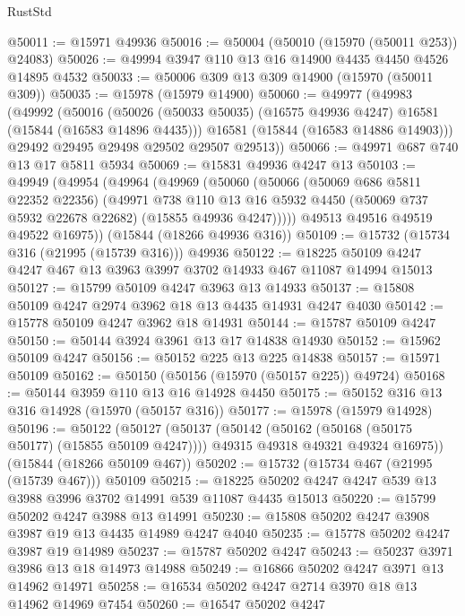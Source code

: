 \begin{lexlean}{RustStd}
\begin{coremodule}
@50011 := @15971 @49936
@50016 := @50004 (@50010 (@15970 (@50011 @253)) @24083)
@50026 := @49994 @3947 @110 @13 @16 @14900 @4435 @4450 @4526 @14895 @4532
@50033 := @50006 @309 @13 @309 @14900 (@15970 (@50011 @309))
@50035 := @15978 (@15979 @14900)
@50060 := @49977
    (@49983
      (@49992
        (@50016
          (@50026 (@50033 @50035) (@16575 @49936 @4247) @16581 (@15844 (@16583 @14896 @4435)))
          @16581
          (@15844 (@16583 @14886 @14903)))
        @29492
        @29495
        @29498
        @29502
        @29507
        @29513))
@50066 := @49971 @687 @740 @13 @17 @5811 @5934
@50069 := @15831 @49936 @4247 @13
@50103 := @49949
    (@49954
      (@49964
        (@49969
          (@50060
            (@50066
              (@50069 @686 @5811 @22352 @22356)
              (@49971
                @738
                @110
                @13
                @16
                @5932
                @4450
                (@50069 @737 @5932 @22678 @22682)
                (@15855 @49936 @4247)))))
        @49513
        @49516
        @49519
        @49522
        @16975))
    (@15844 (@18266 @49936 @316))
@50109 := @15732 (@15734 @316 (@21995 (@15739 @316))) @49936
@50122 := @18225 @50109 @4247 @4247 @467 @13 @3963 @3997 @3702 @14933 @467 @11087 @14994 @15013
@50127 := @15799 @50109 @4247 @3963 @13 @14933
@50137 := @15808 @50109 @4247 @2974 @3962 @18 @13 @4435 @14931 @4247 @4030
@50142 := @15778 @50109 @4247 @3962 @18 @14931
@50144 := @15787 @50109 @4247
@50150 := @50144 @3924 @3961 @13 @17 @14838 @14930
@50152 := @15962 @50109 @4247
@50156 := @50152 @225 @13 @225 @14838
@50157 := @15971 @50109
@50162 := @50150 (@50156 (@15970 (@50157 @225)) @49724)
@50168 := @50144 @3959 @110 @13 @16 @14928 @4450
@50175 := @50152 @316 @13 @316 @14928 (@15970 (@50157 @316))
@50177 := @15978 (@15979 @14928)
@50196 := @50122
    (@50127
      (@50137
        (@50142 (@50162 (@50168 (@50175 @50177) (@15855 @50109 @4247))))
        @49315
        @49318
        @49321
        @49324
        @16975))
    (@15844 (@18266 @50109 @467))
@50202 := @15732 (@15734 @467 (@21995 (@15739 @467))) @50109
@50215 := @18225 @50202 @4247 @4247 @539 @13 @3988 @3996 @3702 @14991 @539 @11087 @4435 @15013
@50220 := @15799 @50202 @4247 @3988 @13 @14991
@50230 := @15808 @50202 @4247 @3908 @3987 @19 @13 @4435 @14989 @4247 @4040
@50235 := @15778 @50202 @4247 @3987 @19 @14989
@50237 := @15787 @50202 @4247
@50243 := @50237 @3971 @3986 @13 @18 @14973 @14988
@50249 := @16866 @50202 @4247 @3971 @13 @14962 @14971
@50258 := @16534 @50202 @4247 @2714 @3970 @18 @13 @14962 @14969 @7454
@50260 := @16547 @50202 @4247

\end{coremodule}
\end{lexlean}
